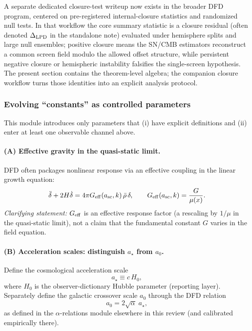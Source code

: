 A separate dedicated closure-test writeup now exists in the broader DFD program, centered on pre-registered internal-closure statistics and randomized null tests. In that workflow the core summary statistic is a closure residual (often denoted $\Delta_{\rm LPD}$ in the standalone note) evaluated under hemisphere splits and large null ensembles; positive closure means the SN/CMB estimators reconstruct a common screen field modulo the allowed offset structure, while persistent negative closure or hemispheric instability falsifies the single-screen hypothesis. The present section contains the theorem-level algebra; the companion closure workflow turns those identities into an explicit analysis protocol.

\subsubsection{Evolving ``constants'' as controlled parameters}\label{sec:psitomo-evolution}

This module introduces only parameters that (i) have explicit definitions and (ii) enter at least one observable channel above.

\paragraph{(A) Effective gravity in the quasi-static limit.}
DFD often packages nonlinear response via an effective coupling in the linear growth equation:
\begin{equation}
\ddot\delta + 2H\dot\delta = 4\pi G_{\rm eff}(a_{\rm sc},k)\,\bar\rho\,\delta,
\qquad
G_{\rm eff}(a_{\rm sc},k)=\frac{G}{\mu(x)}.
\label{eq:psitomo-geff}
\end{equation}
\emph{Clarifying statement:} $G_{\rm eff}$ is an effective response factor (a rescaling by $1/\mu$ in the quasi-static limit), not a claim that the fundamental constant $G$ varies in the field equation.

\paragraph{(B) Acceleration scales: distinguish $a_\star$ from $a_0$.}
Define the cosmological acceleration scale
\begin{equation}
a_\star \equiv c\,H_0,
\label{eq:psitomo-astar}
\end{equation}
where $H_0$ is the observer-dictionary Hubble parameter (reporting layer).
Separately define the galactic crossover scale $a_0$ through the DFD relation
\begin{equation}
a_0 = 2\sqrt{\alpha}\;a_\star,
\label{eq:psitomo-a0}
\end{equation}
as defined in the $\alpha$-relations module elsewhere in this review (and calibrated empirically there).

